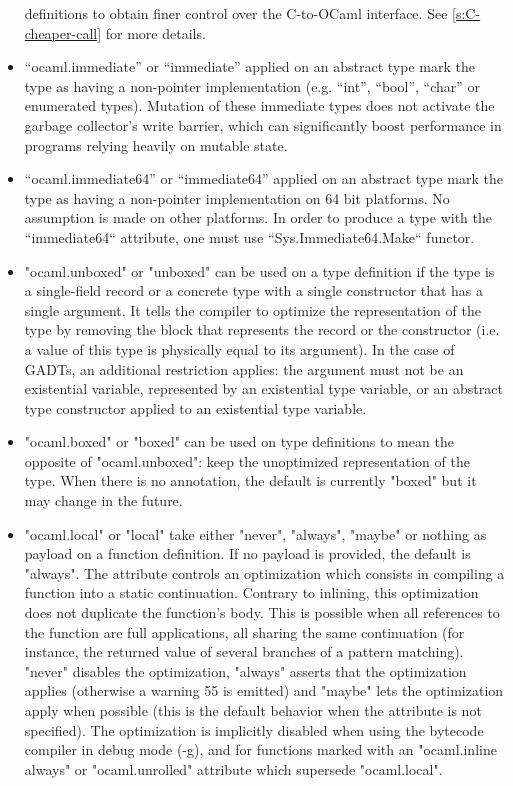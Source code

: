 \begin{itemize}
  definitions to obtain finer control over the C-to-OCaml interface. See
  \ref{s:C-cheaper-call} for more details.
\item
  ``ocaml.immediate'' or ``immediate'' applied on an abstract type mark the type as
  having a non-pointer implementation (e.g. ``int'', ``bool'', ``char'' or
  enumerated types). Mutation of these immediate types does not activate the
  garbage collector's write barrier, which can significantly boost performance in
  programs relying heavily on mutable state.
\item
  ``ocaml.immediate64'' or ``immediate64'' applied on an abstract type mark the
  type as having a non-pointer implementation on 64 bit platforms. No assumption
  is made on other platforms. In order to produce a type with the
  ``immediate64`` attribute, one must use ``Sys.Immediate64.Make`` functor.
\item
  "ocaml.unboxed" or "unboxed" can be used on a type definition if the
  type is a single-field record or a concrete type with a single
  constructor that has a single argument. It tells the compiler to
  optimize the representation of the type by removing the block that
  represents the record or the constructor (i.e. a value of this type
  is physically equal to its argument). In the case of GADTs, an
  additional restriction applies: the argument must not be an
  existential variable, represented by an existential type variable,
  or an abstract type constructor applied to an existential type
  variable.
\item
   "ocaml.boxed" or "boxed" can be used on type definitions to mean
   the opposite of "ocaml.unboxed": keep the unoptimized
   representation of the type. When there is no annotation, the
   default is currently "boxed" but it may change in the future.
 \item
   "ocaml.local" or "local" take either "never", "always", "maybe" or
   nothing as payload on a function definition.  If no payload is
   provided, the default is "always".  The attribute controls an
   optimization which consists in compiling a function into a static
   continuation.  Contrary to inlining, this optimization does not
   duplicate the function's body.  This is possible when all
   references to the function are full applications, all sharing the
   same continuation (for instance, the returned value of several
   branches of a pattern matching). "never" disables the optimization,
   "always" asserts that the optimization applies (otherwise a warning
   55 is emitted) and "maybe" lets the optimization apply when
   possible (this is the default behavior when the attribute is not
   specified).  The optimization is implicitly disabled when using the
   bytecode compiler in debug mode (-g), and for functions marked with
   an "ocaml.inline always" or "ocaml.unrolled" attribute which
   supersede "ocaml.local".
\end{itemize}

